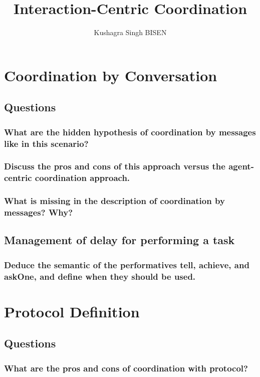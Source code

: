 \documentclass[]{article}
\title{Interaction-Centric Coordination}
\author{Kushagra Singh BISEN}
\begin{document}
\maketitle

\section{Coordination by Conversation}

\subsection{Questions}

\subsubsection{What are the hidden hypothesis of coordination by messages like in this scenario?}
\subsubsection{Discuss the pros and cons of this approach versus the agent-centric coordination approach.}
\subsubsection{What is missing in the description of coordination by messages? Why?}

\subsection{Management of delay for performing a task}

\subsubsection{Deduce the semantic of the performatives tell, achieve, and askOne, and define when they should be used.}

\section{Protocol Definition}

\subsection{Questions}
\subsubsection{What are the pros and cons of coordination with protocol?}
\end{document}
